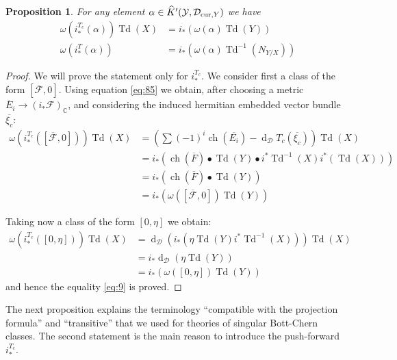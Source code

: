 \documentclass[10pt,twoside]{article}
\numberwithin{equation}{section}
\theoremstyle{plain}
\newtheorem{proposition}[equation]{Proposition}
\theoremstyle{definition}
\DeclareMathOperator{\Td}{Td}
\DeclareMathOperator{\dd}{d}
\DeclareMathOperator{\ch}{ch}
\newcommand{\CC}{{\mathbb C}}
\newcommand{\D}{\text{{\rm cur}}}
\begin{document}
\begin{proposition}
  For any element $\alpha \in \widehat
  K'(\mathcal{Y},\mathcal{D}_{\D,Y})$ we have 
  \begin{align}
    \label{eq:9}
    \omega (i^{T_{c}}_{\ast}(\alpha ))\Td(X)&=
    i_{\ast}(\omega (\alpha )\Td(Y))\\
    \omega (i^{T}_{\ast}(\alpha ))&=
    i_{\ast}(\omega (\alpha )\Td^{-1}(N_{Y/X}))\label{eq:94}
  \end{align}
\end{proposition}

\begin{proof} We will prove the statement only for $i_{\ast}^{T_{c}}$.
We consider first a class of the form $[\overline{\mathcal{F}},0]$.
Using equation \eqref{eq:85} we obtain, after choosing
a metric $\overline{E}_i\longrightarrow (i_{\ast}\mathcal{F})_{\CC}$,
and considering 
the induced hermitian embedded vector bundle $\overline{\xi_{c}}$:
\begin{align*}
\omega (i^{T_{c}}_{\ast}([\overline{\mathcal{F}},0]))\Td(X) &=\left(
\sum(-1)^i\ch(\overline{E_i})-\dd_{\mathcal{D}}
T_{c}(\overline{\xi_{c}})\right)\Td(X)\\  
 &= i_{\ast}(\ch(\overline{F})\bullet
 \Td(Y)\bullet i^{\ast}\Td^{-1}(X)i^{\ast}(\Td(X)))\\
&=i_{\ast}(\ch(\overline{F})\bullet\Td(Y))\\&= i_{\ast}(\omega
([\overline{\mathcal{F}},0] )\Td(Y))
\end{align*}

Taking now a class of the form $[0,\eta]$ we obtain:
\begin{align*}
\omega (i^{T_{c}}_{\ast}([0,\eta]))\Td(X) &=
\dd_{\mathcal{D}}\left(i_{\ast}(\eta\Td(Y)
i^*\Td^{-1}(X))\right)\Td(X)\\
&=i_{\ast}\dd_{\mathcal{D}}(\eta\Td(Y))\\
&=i_{\ast}(\omega ([0,\eta])\Td(Y))
\end{align*}
and hence the equality \ref{eq:9} is proved.
\end{proof}

The next proposition explains the terminology ``compatible with the
projection formula'' and ``transitive'' that we used for theories of
singular Bott-Chern classes. The second statement is the main reason
to introduce the push-forward $i_{\ast}^{T_{c}}$.
\end{document}
